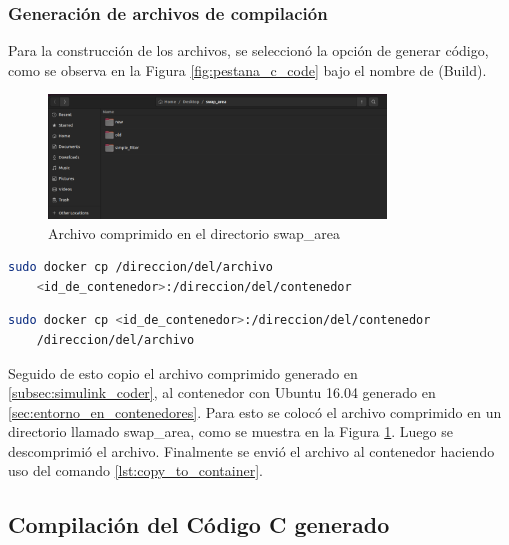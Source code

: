\subsubsection{Generación de archivos de compilación}

Para la construcción de los archivos, se seleccionó la opción de generar código, como se observa en la Figura \ref{fig:pestana_c_code} bajo el nombre de (Build).

\begin{figure}[h!]
    \centering
    \includegraphics[width=0.8\textwidth]{fig/especifico_2/M2MT/paso_a_paso_mtmt/root_folder.pdf}
    \caption{Archivo comprimido en el directorio swap\_area}
    \label{fig:pestana_swap_area}
\end{figure}

\begin{lstlisting}[language=bash, caption={Copiar archivos al contenedor, Linux}, label=lst:copy_to_container]
    sudo docker cp /direccion/del/archivo 
    <id_de_contenedor>:/direccion/del/contenedor
\end{lstlisting}

\begin{lstlisting}[language=bash, caption={Copiar archivos del contenedor, Linux}, label=lst:copy_from_container]
    sudo docker cp <id_de_contenedor>:/direccion/del/contenedor
    /direccion/del/archivo
\end{lstlisting}

Seguido de esto copio el archivo comprimido generado en \ref{subsec:simulink_coder}, al contenedor con Ubuntu 16.04 generado en \ref{sec:entorno_en_contenedores}. Para esto se colocó el archivo comprimido en un directorio llamado swap\_area, como se muestra en la Figura \ref{fig:pestana_swap_area}. Luego se descomprimió el archivo. Finalmente se envió el archivo al contenedor haciendo uso del comando \ref{lst:copy_to_container}.

\newpage

\subsection{Compilación del Código C generado}\label{subsec:compilacion_binario}

